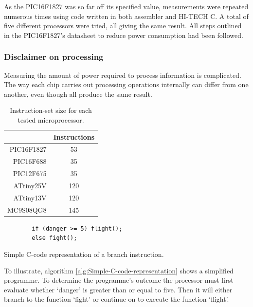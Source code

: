       As the PIC16F1827 was so far off its specified value, measurements were repeated numerous times using code written in both assembler and HI-TECH C.
      A total of five different processors were tried, all giving the same result.
      All steps outlined in the PIC16F1827's datasheet to reduce power consumption had been followed.


    \subsubsection*{Disclaimer on processing}


      Measuring the amount of power required to process information is complicated.
      The way each chip carries out processing operations internally can differ from one another, even though all produce the same result.

      \begin{table}
        \centering
        \begin{tabular}{r|c}
          & Instructions\\
          \hline
          PIC16F1827 & 53\\
          PIC16F688 & 35 \\
          PIC12F675 & 35 \\
          ATtiny25V & 120 \\
          ATtiny13V & 120 \\
          MC9S08QG8 & 145
        \end{tabular}
        \caption{\label{tab:Number-of-instructions}Instruction-set size for each tested microprocessor.}
      \end{table}


      \begin{algorithm}
        \begin{lstlisting}
        if (danger >= 5) flight();
        else fight();
        \end{lstlisting}
        \caption{\label{alg:Simple-C-code-representation}Simple C-code representation of a branch instruction.}
      \end{algorithm}


      To illustrate, algorithm \ref{alg:Simple-C-code-representation} shows a simplified programme.
      To determine  the programme's outcome the processor must first evaluate whether `danger' is greater than or equal to five.
      Then it will either branch to the function `fight' or continue on to execute the function `flight'.

